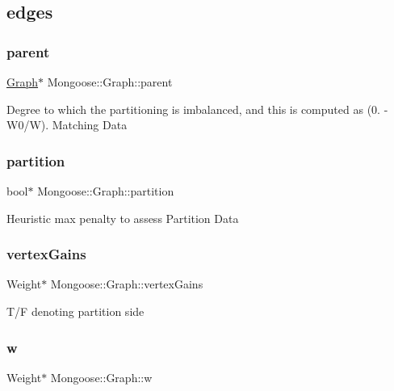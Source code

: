 \subsection*{edges}\hypertarget{class_mongoose_1_1_graph_ae3fa91e7453224cdf98cc3088becaba4}{}\label{class_mongoose_1_1_graph_ae3fa91e7453224cdf98cc3088becaba4} 
\subsubsection{\texorpdfstring{parent}{parent}}
{\footnotesize\ttfamily \hyperlink{class_mongoose_1_1_graph}{Graph}$\ast$ Mongoose\+::\+Graph\+::parent}

Degree to which the partitioning is imbalanced, and this is computed as (0. -\/ W0/W). Matching Data \hypertarget{class_mongoose_1_1_graph_a6f77274bc866a3b61da35f7e2ceb520e}{}\label{class_mongoose_1_1_graph_a6f77274bc866a3b61da35f7e2ceb520e} 
\subsubsection{\texorpdfstring{partition}{partition}}
{\footnotesize\ttfamily bool$\ast$ Mongoose\+::\+Graph\+::partition}

Heuristic max penalty to assess Partition Data \hypertarget{class_mongoose_1_1_graph_acb4ab15f1abccc3532f678a09d194bdd}{}\label{class_mongoose_1_1_graph_acb4ab15f1abccc3532f678a09d194bdd} 
\subsubsection{\texorpdfstring{vertex\+Gains}{vertexGains}}
{\footnotesize\ttfamily Weight$\ast$ Mongoose\+::\+Graph\+::vertex\+Gains}

T/F denoting partition side \hypertarget{class_mongoose_1_1_graph_a9fd62742d8093010fc4b680f1a68dde2}{}\label{class_mongoose_1_1_graph_a9fd62742d8093010fc4b680f1a68dde2} 
\subsubsection{\texorpdfstring{w}{w}}
{\footnotesize\ttfamily Weight$\ast$ Mongoose\+::\+Graph\+::w}

